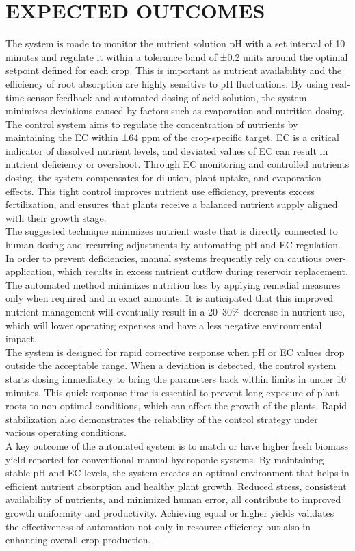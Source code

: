 \chapter{EXPECTED OUTCOMES}
The system is made to monitor the nutrient solution pH with a set interval of 10 minutes and regulate it within a tolerance band of ±0.2 units around the optimal setpoint defined for each crop. This is important as nutrient availability and the efficiency of root absorption are highly sensitive to pH fluctuations. By using real-time sensor feedback and automated dosing of acid solution, the system minimizes deviations caused by factors such as evaporation and nutrition dosing. \\[10pt]
The control system aims to regulate the concentration of nutrients by maintaining the EC within ±64 ppm of the crop-specific target. EC is a critical indicator of dissolved nutrient levels, and deviated values of EC can result in nutrient deficiency or overshoot. Through EC monitoring and controlled nutrients dosing, the system compensates for dilution, plant uptake, and evaporation effects. This tight control improves nutrient use efficiency, prevents excess fertilization, and ensures that plants receive a balanced nutrient supply aligned with their growth stage.\\[10pt]
The suggested technique minimizes nutrient waste that is directly connected to human dosing and recurring adjustments by automating pH and EC regulation. In order to prevent deficiencies, manual systems frequently rely on cautious over-application, which results in excess nutrient outflow during reservoir replacement. The automated method minimizes nutrition loss by applying remedial measures only when required and in exact amounts. It is anticipated that this improved nutrient management will eventually result in a 20–30\% decrease in nutrient use, which will lower operating expenses and have a less negative environmental impact.\\[10pt]
The system is designed for rapid corrective response when pH or EC values drop outside the acceptable range. When a deviation is detected, the control system starts dosing immediately to bring the parameters back within limits in under 10 minutes. This quick response time is essential to prevent long exposure of plant roots to non-optimal conditions, which can affect the growth of the plants. Rapid stabilization also demonstrates the reliability of the control strategy under various operating conditions.\\[10pt]
A key outcome of the automated system is to match or have higher fresh biomass yield reported for conventional manual hydroponic systems. By maintaining stable pH and EC levels, the system creates an optimal environment that helps in efficient nutrient absorption and healthy plant growth. Reduced stress, consistent availability of nutrients, and minimized human error, all contribute to improved growth uniformity and productivity. Achieving equal or higher yields validates the effectiveness of automation not only in resource efficiency but also in enhancing overall crop production.